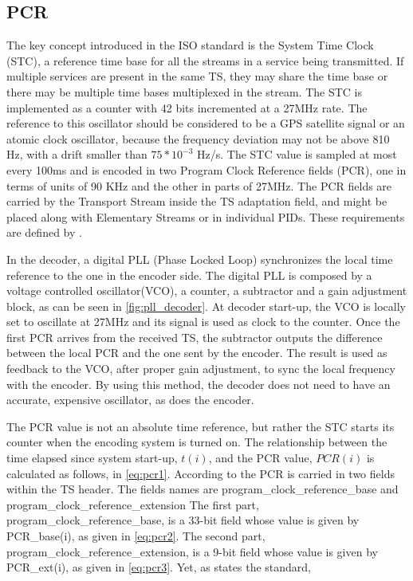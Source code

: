 \documentclass[
	12pt,				%
	openright,			%
	twoside,			%
	a4paper,			%
	brazil,
	french,				%
	english
	]{abntex2}
\begin{document}
\subsection{PCR}

The key concept introduced in the ISO standard is the System Time Clock (STC), a reference time base for all the streams in a service being transmitted. If multiple services are present in the same TS, they may share the time base or there may be multiple time bases multiplexed in the stream. The STC is implemented as a counter with 42 bits incremented at a 27MHz rate. The reference to this oscillator should be considered to be a GPS satellite signal or an atomic clock oscillator, because the frequency deviation may not be above 810 Hz, with a drift smaller than $ 75 * 10^{-3} $ Hz/s. The STC value is sampled at most every 100ms  and is encoded in two Program Clock Reference fields (PCR), one in terms of units of 90 KHz and the other in parts of 27MHz. The PCR fields are carried by the Transport Stream inside the TS adaptation field, and might be placed along with Elementary Streams or in individual PIDs. These requirements are defined by .

In the decoder, a digital PLL (Phase Locked Loop) synchronizes the local time reference to the one in the encoder side. The digital PLL is composed by a voltage controlled oscillator(VCO), a counter, a subtractor and a gain adjustment block, as can be seen in \autoref{fig:pll_decoder}. At decoder start-up, the VCO is locally set to oscillate at 27MHz and its signal is used as clock to the counter. Once the first PCR arrives from the received TS, the subtractor outputs the difference between the local PCR and the one sent by the encoder. The result is used as feedback to the VCO, after proper gain adjustment, to sync the local frequency with the encoder. By using this method, the decoder does not need to have an accurate, expensive oscillator, as does the encoder.

The PCR value is not an absolute time reference, but rather the STC starts its counter when the encoding system is turned on. The relationship between the time elapsed since system start-up, $t(i)$, and the PCR value, $PCR(i)$ is calculated as follows, in \autoref{eq:pcr1}. According to  the PCR is carried in two fields within the TS header. The fields names are program\_clock\_reference\_base and program\_clock\_reference\_extension The first part, program\_clock\_reference\_base, is a 33-bit field whose value is given by PCR\_base(i), as given in \autoref{eq:pcr2}. The second part, program\_clock\_reference\_extension, is a 9-bit field whose value is given by PCR\_ext(i), as given in \autoref{eq:pcr3}. Yet, as states the standard, 
\end{document}
